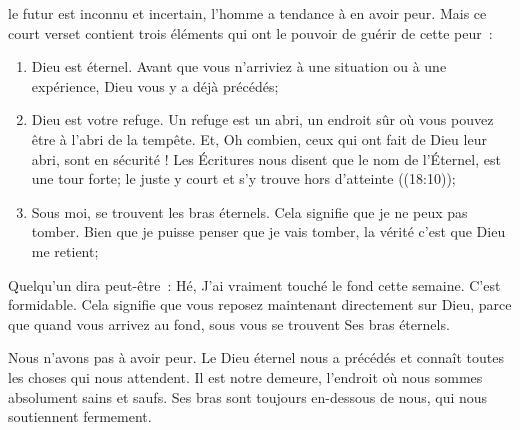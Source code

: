 \dvrule






 le futur est inconnu et incertain,
 l'homme a tendance à en avoir peur. Mais ce court verset
 contient trois éléments qui ont le pouvoir de guérir de cette peur~:

\begin{enumerate}[(1)]%
  \item Dieu est éternel. Avant que vous n'arriviez à une situation
   ou à une expérience, Dieu vous y a déjà précédés;
  \item Dieu est votre refuge. Un refuge est un abri,
   un endroit sûr où vous pouvez être à l'abri de la tempête.
   Et, Oh combien, ceux qui ont fait de Dieu leur abri, sont en sécurité !
   Les Écritures nous disent que le nom de l'Éternel, est une tour forte;
   le juste y court et s'y trouve hors d'atteinte ((18:10));
  \item Sous moi, se trouvent les bras éternels.
   Cela signifie que je ne peux pas tomber.
   Bien que je puisse penser que je vais tomber,
   la vérité c'est que Dieu me retient;
\end{enumerate}


Quelqu'un dira peut-être~:
 \og Hé, J'ai vraiment touché le fond cette semaine. \fg{}
 C'est formidable. Cela signifie que vous reposez maintenant
 directement sur Dieu, parce que quand vous arrivez au fond,
 sous vous se trouvent Ses bras éternels.

Nous n'avons pas à avoir peur.
 Le Dieu éternel nous a précédés et connaît toutes les choses
 qui nous attendent. Il est notre demeure,
 l'endroit où nous sommes absolument sains et saufs.
 Ses bras sont toujours en-dessous de nous, qui nous soutiennent fermement. 

\dvrule

